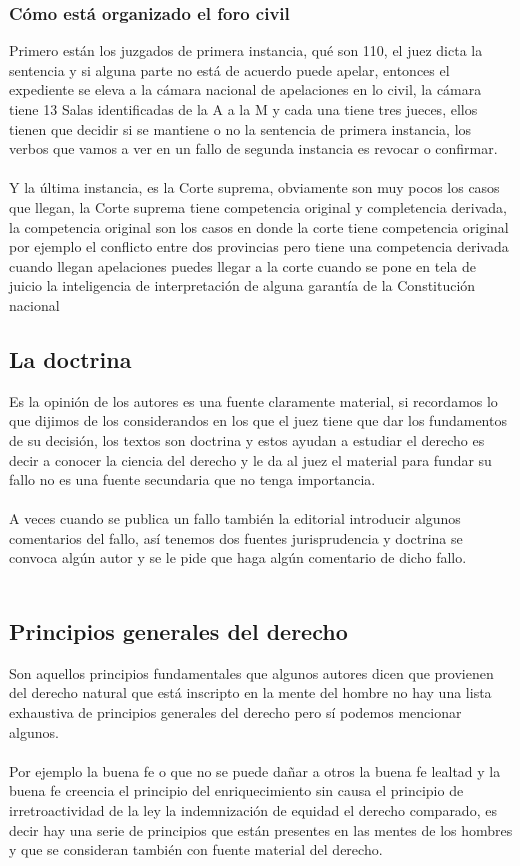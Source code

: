 \documentclass[12pt]{book}
\begin{document}
\subsubsection{Cómo está organizado el foro civil}
Primero están los juzgados de primera instancia, qué son 110, el juez dicta la sentencia y si alguna parte no está de acuerdo puede apelar, entonces el expediente se eleva a la cámara nacional de apelaciones en lo civil, la cámara tiene 13 Salas identificadas de la A a la M y cada una tiene tres jueces, ellos tienen que decidir si se mantiene o no la sentencia de primera instancia, los verbos que vamos a ver en un fallo de segunda instancia es revocar o confirmar.
\\
\\
Y la última instancia, es la Corte suprema, obviamente son muy pocos los casos que llegan, la Corte suprema tiene competencia original y completencia derivada, la competencia original son los casos en donde la corte tiene competencia original por ejemplo el conflicto entre dos provincias pero tiene una competencia derivada cuando llegan apelaciones puedes llegar a la corte cuando se pone en tela de juicio la inteligencia de interpretación de alguna garantía de la Constitución nacional


\subsection{La doctrina}
Es la opinión de los autores es una fuente claramente material, si recordamos lo que dijimos de los considerandos en los que el juez tiene que dar los fundamentos de su decisión, los textos son doctrina y estos ayudan a estudiar el derecho es decir a conocer la ciencia del derecho y le da al juez el material para fundar su fallo no es una fuente secundaria que no tenga importancia.
\\
\\
A veces cuando se publica un fallo también la editorial introducir algunos comentarios del fallo, así tenemos dos fuentes jurisprudencia y doctrina se convoca algún autor y se le pide que haga algún comentario de dicho fallo.
\\
\\

\subsection{Principios generales del derecho}
Son aquellos principios fundamentales que algunos autores dicen que provienen del derecho natural que está inscripto en la mente del hombre no hay una lista exhaustiva de principios generales del derecho pero sí podemos mencionar algunos.
\\
\\
Por ejemplo la buena fe o que no se puede dañar a otros la buena fe lealtad y la buena fe creencia el principio del enriquecimiento sin causa el principio de irretroactividad de la ley la indemnización de equidad el derecho comparado, es decir hay una serie de principios que están presentes en las mentes de los hombres y que se consideran también con fuente material del derecho.
\end{document}

